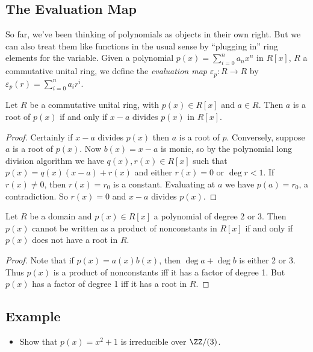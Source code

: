 \documentclass{article}
\begin{document}
\subsection*{The Evaluation Map}

So far, we've been thinking of polynomials as objects in their own right. But we can also treat them like functions in the usual sense by ``plugging in'' ring elements for the variable. Given a polynomial $p(x) = \sum_{i=0}^n a_nx^n$ in $R[x]$, $R$ a commutative unital ring, we define the \emph{evaluation map} $\varepsilon_p : R \rightarrow R$ by $\varepsilon_p(r) = \sum_{i=0}^n a_i r^i$.

\begin{prop}
Let $R$ be a commutative unital ring, with $p(x) \in R[x]$ and $a \in R$. Then $a$ is a root of $p(x)$ if and only if $x-a$ divides $p(x)$ in $R[x]$.
\end{prop}

\begin{proof}
Certainly if $x-a$ divides $p(x)$ then $a$ is a root of $p$. Conversely, suppose $a$ is a root of $p(x)$. Now $b(x) = x - a$ is monic, so by the polynomial long division algorithm we have $q(x), r(x) \in R[x]$ such that $p(x) = q(x)(x-a) + r(x)$ and either $r(x) = 0$ or $\deg{r} < 1$. If $r(x) \neq 0$, then $r(x) = r_0$ is a constant. Evaluating at $a$ we have $p(a) = r_0$, a contradiction. So $r(x) = 0$ and $x-a$ divides $p(x)$.
\end{proof}

\begin{prop}
Let $R$ be a domain and $p(x) \in R[x]$ a polynomial of degree 2 or 3. Then $p(x)$ cannot be written as a product of nonconstants in $R[x]$ if and only if $p(x)$ does not have a root in $R$.
\end{prop}

\begin{proof}
Note that if $p(x) = a(x)b(x)$, then $\deg{a} + \deg{b}$ is either 2 or 3. Thus $p(x)$ is a product of nonconstants iff it has a factor of degree 1. But $p(x)$ has a factor of degree 1 iff it has a root in $R$.
\end{proof}

\subsection*{Example}

\begin{itemize}
\item Show that $p(x) = x^2 + 1$ is irreducible over $\ZZ/(3)$. 
\end{itemize}
\end{document}
